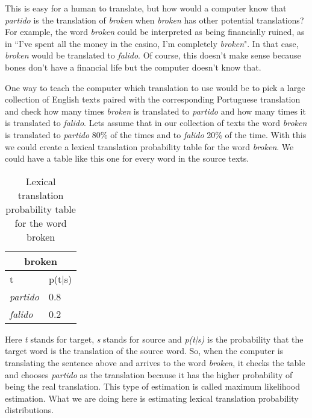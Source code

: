 This is easy for a human to translate, but how would a computer know that \textit{partido} is the translation of \textit{broken} when \textit{broken} has other potential translations? For example, the word \textit{broken} could be interpreted as being financially ruined, as in “I’ve spent all the money in the casino, I'm completely \textit{broken}". In that case, \textit{broken} would be translated to \textit{falido}. Of course, this doesn't make sense because bones don't have a financial life but the computer doesn't know that. 

One way to teach the computer which translation to use would be to pick a large collection of English texts paired with the corresponding Portuguese translation and check how many times \textit{broken} is translated to \textit{partido} and how many times it is translated to \textit{falido}. Lets assume that in our collection of texts the word \textit{broken} is translated to \textit{partido} 80\% of the times and to \textit{falido} 20\% of the time. With this we could create a lexical translation probability table for the word \textit{broken}. We could have a table like this one for every word in the source texts.

\begin{table}[ht]
\centering
\begin{tabular}{ll}
\multicolumn{2}{c}{\textbf{broken}} \\ \hline
t                     & p(t|s)      \\ \hline
\textit{partido}      & 0.8         \\
\textit{falido}       & 0.2         \\ \hline
\end{tabular}
\caption{Lexical translation probability table for the word broken}
\label{table:translation-prob-table}
\end{table}

Here \textit{t} stands for target, \textit{s} stands for source and \textit{p(t|s)} is the probability that the target word is the translation of the source word. So, when the computer is translating the sentence above and arrives to the word \textit{broken}, it checks the table and chooses \textit{partido} as the translation because it has the higher probability of being the real translation. This type of estimation is called maximum likelihood estimation. What we are doing here is estimating lexical translation probability distributions.

